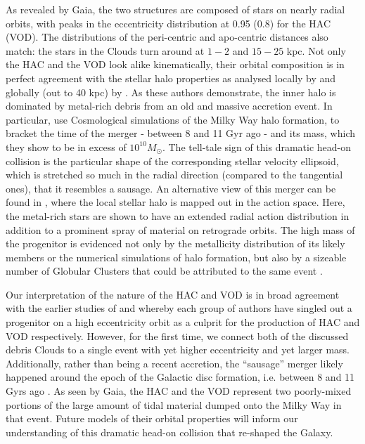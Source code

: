 \documentclass[fleqn,usenatbib]{mnras}
\begin{document}
As revealed by Gaia, the two structures are composed of stars on
nearly radial orbits, with peaks in the eccentricity distribution at
0.95 (0.8) for the HAC (VOD). The distributions of the peri-centric
and apo-centric distances also match: the stars in the Clouds turn
around at $1-2$ and $15-25$ kpc. Not only the HAC and the VOD look
alike kinematically, their orbital composition is in perfect agreement
with the stellar halo properties as analysed locally by
\citet{Belokurov2018} and globally (out to 40 kpc) by
\citet{Deason2018pileup}. As these authors demonstrate, the inner halo
is dominated by metal-rich debris from an old and massive accretion
event. In particular, \citet{Belokurov2018} use Cosmological
simulations of the Milky Way halo formation, to bracket the time of
the merger - between 8 and 11 Gyr ago - and its mass, which they show
to be in excess of $10^{10} M_{\odot}$. The tell-tale sign of this
dramatic head-on collision is the particular shape of the
corresponding stellar velocity ellipsoid, which is stretched so much
in the radial direction (compared to the tangential ones), that it
resembles a sausage. An alternative view of this merger can be found
in \citet{actionhalo}, where the local stellar halo is mapped out in
the action space. Here, the metal-rich stars are shown to have an
extended radial action distribution in addition to a prominent spray
of material on retrograde orbits. The high mass of the progenitor is
evidenced not only by the metallicity distribution of its likely
members or the numerical simulations of halo formation, but also by a
sizeable number of Globular Clusters that could be attributed to the
same event \citep[see][]{sausagegc,Kruijssen2018}.

Our interpretation of the nature of the HAC and VOD is in broad
agreement with the earlier studies of \citet{Jo2012} and \citet{Ca12}
whereby each group of authors have singled out a progenitor on a high
eccentricity orbit as a culprit for the production of HAC and VOD
respectively. However, for the first time, we connect both of the
discussed debris Clouds to a single event with yet higher eccentricity
and yet larger mass. Additionally, rather than being a recent
accretion, the ``sausage'' merger likely happened around the epoch of
the Galactic disc formation, i.e. between 8 and 11 Gyrs ago
\citep[see][]{Belokurov2018}. As seen by Gaia, the HAC and the VOD
represent two poorly-mixed portions of the large amount of tidal
material dumped onto the Milky Way in that event. Future models of
their orbital properties \citep[along the lines of the ideas laid out
  in e.g.][]{Jo2012,Sanderson2013} will inform our understanding of this
dramatic head-on collision that re-shaped the Galaxy.
\end{document}
